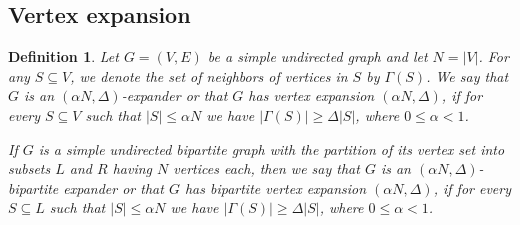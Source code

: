 \documentclass{article}
\newtheorem{definition}[theorem]{Definition}
\begin{document}
\subsection{Vertex expansion}
\begin{definition}
Let $G=(V,E)$ be a simple undirected graph and let $N=|V|$. For any $S\subseteq V$, we denote the set of neighbors of vertices in $S$ by $\Gamma(S)$. We say that $G$ is an $(\alpha N,\Delta )$-expander or that $G$ has vertex expansion $(\alpha N,\Delta )$, if for every $S\subseteq V$ such that $|S|\leq\alpha N$ we have $|\Gamma(S)|\geq \Delta |S|$, where $0\leq \alpha <1$.

If $G$ is a simple undirected bipartite graph with the partition of its vertex set into subsets $L$ and $R$ having $N$ vertices each, then we say that $G$ is an $(\alpha N,\Delta )$-bipartite expander or that $G$ has bipartite vertex expansion $(\alpha N,\Delta )$, if for every $S\subseteq L$ such that $|S|\leq\alpha N$ we have $|\Gamma(S)|\geq \Delta|S|$, where $0\leq \alpha <1$.
\end{definition}
\end{document}
